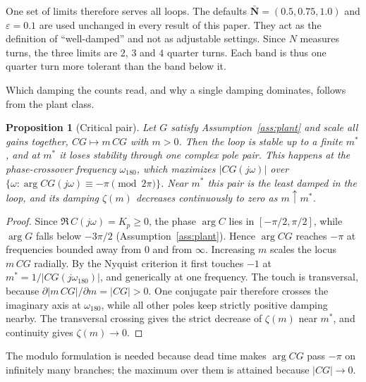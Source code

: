 \documentclass[final,3p,times,twocolumn]{elsarticle}
\newcommand{\rev}[1]{#1}   %
\newcommand{\fix}[1]{#1}  %
\newtheorem{proposition}{Proposition}
\begin{document}
\begin{sloppypar}
One set of limits therefore serves all loops. The defaults
$\bar{\mathbf N} = (0.5, 0.75, 1.0)$ and $\varepsilon = 0.1$ are used
unchanged in every result of this paper. They act as the definition of
``well-damped'' and not as adjustable settings. Since $N$ measures
turns, the three limits are $2$, $3$ and $4$ quarter turns. Each band is
thus one quarter turn more tolerant than the band below it.
\end{sloppypar}

Which damping the counts read, and why a single damping dominates,
follows from the plant class.

\begin{proposition}[Critical pair]\label{prop:pair}
Let $G$ satisfy Assumption~\ref{ass:plant} and scale all gains
together, $CG \mapsto m\,CG$ with $m>0$. Then the loop is stable up to a
finite $m^\ast$, and at $m^\ast$ it loses stability through one complex
pole pair. This happens at the phase-crossover frequency
$\omega_{180}$, which maximizes $|CG(j\omega)|$ over
$\{\omega:\arg CG(j\omega)\rev{\equiv-\pi \pmod{2\pi}}\}$. Near $m^\ast$
this pair is the least damped in the loop, and its damping $\zeta(m)$
decreases continuously to zero as $m\uparrow m^\ast$.
\end{proposition}

\begin{proof}
Since $\Re\,C(j\omega) = K_p \ge 0$, the phase $\arg C$ lies in
$[-\pi/2,\pi/2]$, while \fix{$\arg G$ falls below $-3\pi/2$
(Assumption~\ref{ass:plant})}. Hence $\arg CG$ reaches $-\pi$ at
frequencies bounded away from $0$ and from $\infty$. Increasing $m$
scales the locus $m\,CG$ radially. By the Nyquist criterion
\cite{Nyquist1932} it first touches $-1$ at
$m^\ast = 1/|CG(j\omega_{180})|$, and generically at one frequency. The
touch is transversal, because $\partial|m\,CG|/\partial m = |CG| > 0$.
One conjugate pair therefore crosses the imaginary axis at
$\omega_{180}$, while all other poles keep strictly positive damping
nearby. \rev{The transversal crossing gives the strict decrease of
$\zeta(m)$ near $m^\ast$, and continuity gives $\zeta(m) \to 0$.}
\end{proof}

\rev{The modulo formulation is needed because dead time makes
$\arg CG$ pass $-\pi$ on infinitely many branches; the maximum over them
is attained because $|CG| \to 0$.}
\end{document}
